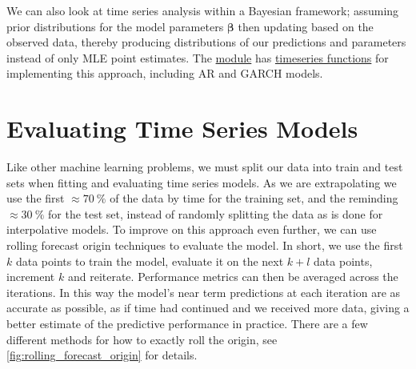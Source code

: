 We can also look at time series analysis within a Bayesian framework;
assuming prior distributions for the model parameters $\bm{\beta}$
then updating based on the observed data,
thereby producing distributions of our predictions and parameters instead of only MLE point estimates.
The \pymcThree \href{https://docs.pymc.io}{module}
has \href{https://docs.pymc.io/api/distributions/timeseries.html}{timeseries functions}
for implementing this approach, including AR and GARCH models.

\section{Evaluating Time Series Models}
\label{time_series:eval}

Like other machine learning problems, we must split our data into train and test sets
when fitting and evaluating time series models.
As we are extrapolating we use the first
$\approx \SI{70}{\percent}$ of the data by time for the training set,
and the reminding $\approx \SI{30}{\percent}$ for the test set,
instead of randomly splitting the data as is done for interpolative models.
To improve on this approach even further, we can use
rolling forecast origin techniques to evaluate the model.
In short, we use the first $k$ data points to train the model,
evaluate it on the next $k + l$ data points, increment $k$ and reiterate.
Performance metrics can then be averaged across the iterations.
In this way the model's near term predictions at each iteration are as accurate as possible,
as if time had continued and we received more data,
giving a better estimate of the predictive performance in practice.
There are a few different methods for how to exactly roll the origin,
see \cref{fig:rolling_forecast_origin} for details.

